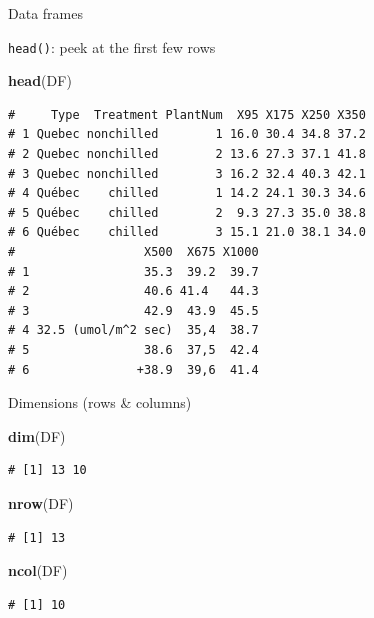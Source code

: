\documentclass[
  11pt,
  ignorenonframetext,
]{beamer}
\newenvironment{Shaded}{\begin{snugshade}}{\end{snugshade}}
\newcommand{\FunctionTok}[1]{\textcolor[rgb]{0.13,0.29,0.53}{\textbf{#1}}}
\newcommand{\NormalTok}[1]{#1}
\begin{document}
\begin{frame}{Data frames}
\protect\hypertarget{data-frames}{}
\end{frame}

\begin{frame}[fragile]{\texttt{head()}: peek at the first few rows}
\protect\hypertarget{head-peek-at-the-first-few-rows}{}
\begin{Shaded}
\begin{Highlighting}[]
\FunctionTok{head}\NormalTok{(DF)}
\end{Highlighting}
\end{Shaded}

\begin{verbatim}
#     Type  Treatment PlantNum  X95 X175 X250 X350
# 1 Quebec nonchilled        1 16.0 30.4 34.8 37.2
# 2 Quebec nonchilled        2 13.6 27.3 37.1 41.8
# 3 Quebec nonchilled        3 16.2 32.4 40.3 42.1
# 4 Québec    chilled        1 14.2 24.1 30.3 34.6
# 5 Québec    chilled        2  9.3 27.3 35.0 38.8
# 6 Québec    chilled        3 15.1 21.0 38.1 34.0
#                  X500  X675 X1000
# 1                35.3  39.2  39.7
# 2                40.6 41.4   44.3
# 3                42.9  43.9  45.5
# 4 32.5 (umol/m^2 sec)  35,4  38.7
# 5                38.6  37,5  42.4
# 6               +38.9  39,6  41.4
\end{verbatim}
\end{frame}

\begin{frame}[fragile]{Dimensions (rows \& columns)}
\protect\hypertarget{dimensions-rows-columns}{}
\begin{Shaded}
\begin{Highlighting}[]
\FunctionTok{dim}\NormalTok{(DF)}
\end{Highlighting}
\end{Shaded}

\begin{verbatim}
# [1] 13 10
\end{verbatim}

\begin{Shaded}
\begin{Highlighting}[]
\FunctionTok{nrow}\NormalTok{(DF)}
\end{Highlighting}
\end{Shaded}

\begin{verbatim}
# [1] 13
\end{verbatim}

\begin{Shaded}
\begin{Highlighting}[]
\FunctionTok{ncol}\NormalTok{(DF)}
\end{Highlighting}
\end{Shaded}

\begin{verbatim}
# [1] 10
\end{verbatim}
\end{frame}
\end{document}
